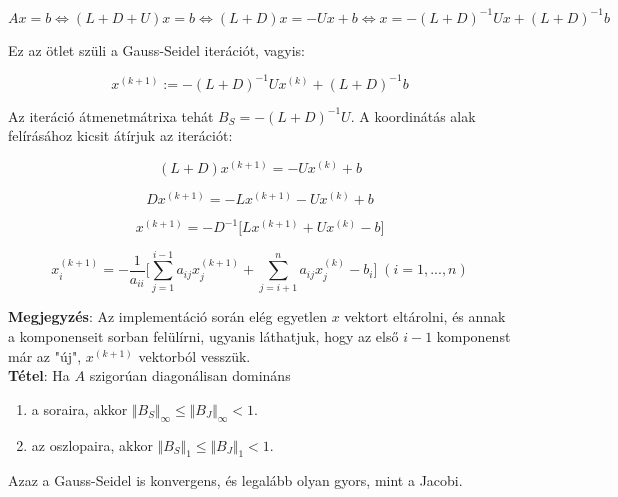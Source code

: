 \documentclass[margin=0px]{article}
\begin{document}
	\begin{displaymath}
	Ax = b \Longleftrightarrow (L + D + U)x = b \Longleftrightarrow (L+D)x = -Ux+b \Longleftrightarrow
	x = -(L+D)^{-1}Ux + (L+D)^{-1}b
	\end{displaymath}
	
	\noindent Ez az ötlet szüli a Gauss-Seidel iterációt, vagyis:
	
	\begin{displaymath}
	x^{(k+1)} :=  -(L+D)^{-1}Ux^{(k)} + (L+D)^{-1}b
	\end{displaymath}
	
	Az iteráció átmenetmátrixa tehát $B_{S} = -(L+D)^{-1}U$. A koordinátás alak felírásához kicsit átírjuk
	az iterációt:
	
	\begin{displaymath}
		(L+D)x^{(k+1)} = -Ux^{(k)} + b
	\end{displaymath}

	\begin{displaymath}
		Dx^{(k+1)} = -Lx^{(k+1)} - Ux^{(k)} + b
	\end{displaymath}
	
	\begin{displaymath}
		x^{(k+1)} = -D^{-1} \big[Lx^{(k+1)} + Ux^{(k)} - b \big]
	\end{displaymath}
	
	\begin{displaymath}
	x^{(k+1)}_{i} =
	-\frac{1}{a_{ii}}
	\Bigg[
	\sum_{j=1}^{i-1} a_{ij}x_{j}^{(k+1)} +
	\sum_{j=i+1}^{n} a_{ij}x_{j}^{(k)}	-
	b_{i}
	\Bigg]
	\; (i = 1, ..., n)
	\end{displaymath}
	
	\noindent \textbf{Megjegyzés}: Az implementáció során elég egyetlen $x$ vektort eltárolni, és annak a komponenseit sorban felülírni, ugyanis
	láthatjuk, hogy az első $i-1$ komponenst már az "új", $x^{(k+1)}$ vektorból vesszük.\\
	
	\noindent \textbf{Tétel}: Ha $A$ szigorúan diagonálisan domináns
	\begin{enumerate}
		\item	a soraira, akkor
		$\Vert B_{S} \Vert_{\infty} \leq \Vert B_{J} \Vert_{\infty} < 1$.
				
		\item  az oszlopaira, akkor
		$\Vert B_{S} \Vert_{1} \leq \Vert B_{J} \Vert_{1} < 1$.
	\end{enumerate}
	
	\noindent Azaz a Gauss-Seidel is konvergens, és legalább olyan gyors, mint a Jacobi.
	
\end{document}
